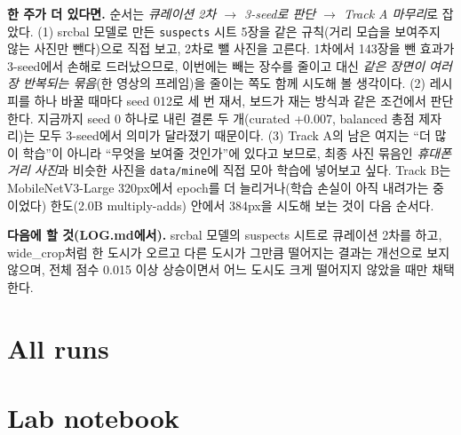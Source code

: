 \documentclass[11pt]{article}
\begin{document}
\textbf{한 주가 더 있다면.} 순서는 \emph{큐레이션 2차 $\rightarrow$ 3-seed로 판단 $\rightarrow$ Track A 마무리}로
잡았다. (1) srcbal 모델로 만든 \texttt{suspects} 시트 5장을 같은 규칙(거리 모습을
보여주지 않는 사진만 뺀다)으로 직접 보고, 2차로 뺄 사진을 고른다. 1차에서 143장을 뺀
효과가 3-seed에서 손해로 드러났으므로, 이번에는 빼는 장수를 줄이고 대신 \emph{같은
장면이 여러 장 반복되는 묶음}(한 영상의 프레임)을 줄이는 쪽도 함께 시도해 볼 생각이다.
(2) 레시피를 하나 바꿀 때마다 seed 0\textperiodcentered{}1\textperiodcentered{}2로 세 번 재서, 보드가 재는 방식과 같은 조건에서
판단한다. 지금까지 seed 0 하나로 내린 결론 두 개(curated +0.007, balanced 총점 제자리)는
모두 3-seed에서 의미가 달라졌기 때문이다. (3) Track A의 남은 여지는 ``더 많이 학습''이
아니라 ``무엇을 보여줄 것인가''에 있다고 보므로, 최종 사진 묶음인 \emph{휴대폰 거리
사진}과 비슷한 사진을 \texttt{data/mine}에 직접 모아 학습에 넣어보고 싶다. Track B는
MobileNetV3-Large 320px에서 epoch를 더 늘리거나(학습 손실이 아직 내려가는 중이었다)
한도(2.0B multiply-adds) 안에서 384px을 시도해 보는 것이 다음 순서다.

\textbf{다음에 할 것(LOG.md에서).} srcbal 모델의 suspects 시트로 큐레이션 2차를 하고,
wide\_crop처럼 한 도시가 오르고 다른 도시가 그만큼 떨어지는 결과는 개선으로 보지 않으며,
전체 점수 0.015 이상 상승이면서 어느 도시도 크게 떨어지지 않았을 때만 채택한다.

\section*{All runs}

\section*{Lab notebook}
\end{document}
